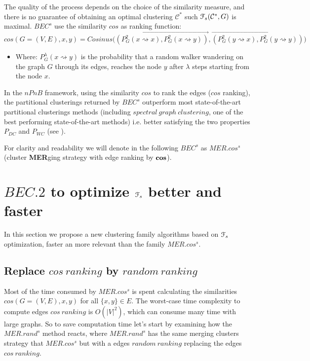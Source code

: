 \documentclass[12pt]{article}
\theoremstyle{thmstyleone}%
\theoremstyle{definition}
\begin{document}
The quality of the process depends on the choice of the similarity measure, and there is no guarantee of obtaining an optimal clustering
$\mathcal{C}^{*}$ such $\EuScript{F}_{s}(\mathcal{C}^{*},G)$ is maximal.
$BEC^{s}$ use the similarity $cos$ as ranking function:
\begin{equation*}%
\label{SimCos}
cos(G=(V,E),x,y)=Cosinus\big(\overrightarrow{(P^2_G(x{\rightsquigarrow}x), P^2_G(x{\rightsquigarrow}y))}, \overrightarrow{(P^2_G(y{\rightsquigarrow}x), P^2_G(y{\rightsquigarrow}y))}\big)
\end{equation*}
\noindent
\begin{itemize}
 \item[] Where: $P^{\lambda}_{G}(x{\rightsquigarrow}y)$ is the probability that a random walker wandering on the graph $G$ through its edges, reaches the node $y$ after $\lambda$ steps starting from the node $x$.
\end{itemize}

\noindent
In the $nPnB$ framework, using the similarity $cos$ to rank the edges ($cos$ ranking), the partitional clusterings returned by $BEC^{s}$ outperform most state-of-the-art partitional clusterings methods (including $spectral~graph~clustering$, one of the best performing state-of-the-art methods) i.e. better satisfying the two properties $P_{DC}$ and $P_{WC}$ (see \cite{Gaume_BEC1_2025}).

For clarity and readability we will denote in the following
$BEC^{s}$ as $MER.cos^{s}$ (cluster {\bf MER}ging strategy with edge ranking by $\bf cos$).

\section{$BEC.2$ to optimize $\EuScript{F}_{s}$ better and faster \label{BEC.2}}
In this section we propose a new clustering family algorithms based on $\EuScript{F}_{s}$ optimization, faster an more relevant than the family $MER.cos^{s}$.

\subsection{Replace $cos~ranking$ by $random~ranking$ \label{Replace}}
Most of the time consumed by $MER.cos^{s}$ is spent calculating the similarities $cos(G=(V,E), x, y)$ for all $\{x,y\} \in E$.
The worst-case time complexity to compute edges $cos~ranking$ is $O(|V|^2)$, which can consume many time with large graphs.
So to save computation time let's start by examining how the $MER.rand^{s}$ method reacts,
where $MER.rand^{s}$ has the same merging clusters strategy that $MER.cos^{s}$ but with a edges $random~ranking$ replacing the edges $cos~ranking$.
\end{document}
